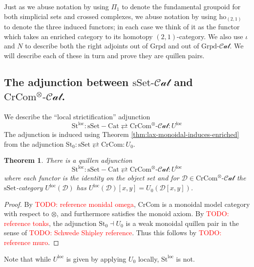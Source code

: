 \documentclass[12pt]{article}
\newtheorem{theorem}{Theorem}[section]
\theoremstyle{definition}
\newcommand{\TODO}[1]{\textcolor{red}{TODO: {#1}}}
\newcommand{\D}{\mathcal{D}}
\newcommand{\sset}{\text{sSet}}
\newcommand{\crcom}{\text{CrCom}}
\newcommand{\grpd}{\text{Grpd}}
\newcommand{\tensorcrossedcat}{\crcom^\otimes\text{-}\mathcal{Cat}}
\newcommand{\grpdcat}{\text{Grpd}\text{-}\mathcal{Cat}}
\newcommand{\ssetcat}{\text{sSet}\text{-}\mathcal{Cat}}
\newcommand{\ho}{\text{ho}}
\newcommand{\st}{\text{St}}
\newcommand{\leftone}{\st^{\text{loc}}}
\newcommand{\rightone}{U^{\text{loc}}}
\newcommand{\hotwo}{\ho_{(2,1)}}
\begin{document}
	Just as we abuse notation by using $\Pi_1$ to denote the fundamental groupoid for both simplicial sets and crossed complexes, we abuse notation by using $\hotwo$ to denote the three induced functors; in each case we think of it as the functor which takes an enriched category to its homotopy $(2,1)$-category. We also use $\iota$ and $N$ to describe both the right adjoints out of $\grpd$ and out of $\grpdcat$. 
	We will describe each of these in turn and prove they are quillen pairs. 
\subsection{The adjunction between $\ssetcat$ and $\tensorcrossedcat$.}
	We describe the ``local strictification'' adjunction 
	$$
		\leftone: \sset-\text{Cat} \rightleftarrows \tensorcrossedcat: \rightone
	$$
	The adjunction is induced using Theorem \ref{thm:lax-monoidal-induces-enriched} from the adjunction $\text{St}_0: \sset \rightleftarrows \crcom :  U_0$.
	\begin{theorem}
		There is a quillen adjunction 
		$$
		\leftone: \sset-\text{Cat} \rightleftarrows \tensorcrossedcat: \rightone
		$$
		where each functor is the identity on the object set and 
		for $\D \in \tensorcrossedcat$ the $\sset$-category $\rightone(\D)$ has $\rightone(\D)[x,y] = U_0(\D[x,y])$. 
	\end{theorem}
	\begin{proof}
		By \TODO{reference monidal omega}, $\crcom$ is a monoidal model category with respect to $\otimes$, and furthermore satisfies the monoid axiom. By \TODO{reference tonks}, the adjunction $\st_0 \dashv U_0$ is a weak monoidal quillen pair in the sense of \TODO{Schwede Shipley reference}. Thus this follows by \TODO{reference muro}.
	\end{proof} 
	Note that while $\rightone$ is given by applying $U_0$ locally, $\leftone$ is not. 
\end{document}
